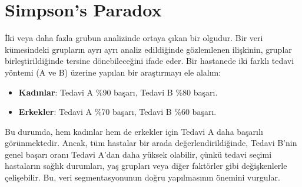 \section{Simpson's Paradox}

İki veya daha fazla grubun analizinde ortaya çıkan bir olgudur. Bir veri kümesindeki grupların ayrı ayrı analiz edildiğinde gözlemlenen ilişkinin, gruplar birleştirildiğinde tersine dönebileceğini ifade eder. 
Bir hastanede iki farklı tedavi yöntemi (A ve B) üzerine yapılan bir araştırmayı ele alalım:
\begin{itemize}
    \item \textbf{Kadınlar}: Tedavi A \%90 başarı, Tedavi B \%80 başarı.
    \item \textbf{Erkekler}: Tedavi A \%70 başarı, Tedavi B \%60 başarı.
\end{itemize}

Bu durumda, hem kadınlar hem de erkekler için Tedavi A daha başarılı görünmektedir. Ancak, tüm hastalar bir arada değerlendirildiğinde, Tedavi B'nin genel başarı oranı Tedavi A'dan daha yüksek olabilir, çünkü tedavi seçimi hastaların sağlık durumları, yaş grupları veya diğer faktörler gibi değişkenlerle çelişebilir. Bu, veri segmentasyonunun doğru yapılmasının önemini vurgular.

\newpage
